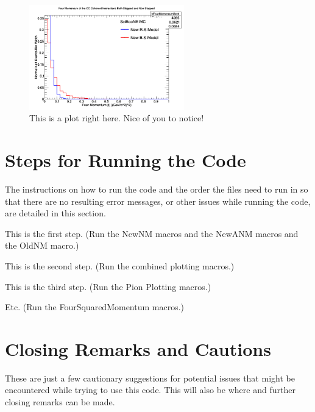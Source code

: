 \documentclass[11pt]{article}
\begin{document}
\begin{figure}[H]
\centering
\includegraphics[width=0.6\textwidth]{ANMFourSquaredPlottingImages/6-ANMFourSquaredPlotting.png}
\caption{This is a plot right here. Nice of you to notice!}
\end{figure}



\section{Steps for Running the Code}
The instructions on how to run the code and the order the files need to run in so that there are no resulting error messages, or other issues while running the code, are detailed in this section.

\begin{adjustwidth}{4.0em}{0pt}
\begin{steps}
  \item This is the first step. (Run the NewNM macros and the NewANM macros and the OldNM macro.)
  \item This is the second step. (Run the combined plotting macros.)
  \item This is the third step. (Run the Pion Plotting macros.)
  \item Etc. (Run the FourSquaredMomentum macros.)
\end{steps}
\end{adjustwidth}



\section{Closing Remarks and Cautions}
These are just a few cautionary suggestions for potential issues that might be encountered while trying to use this code. This will also be where and further closing remarks can be made.
\end{document}
